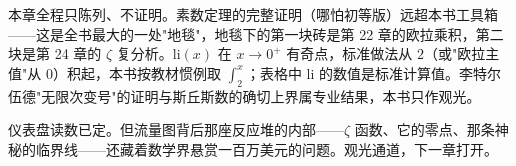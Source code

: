 \begin{chengshi}
本章全程只陈列、不证明。素数定理的完整证明（哪怕初等版）远超本书工具箱——这是全书最大的一处"地毯"，地毯下的第一块砖是第 22 章的欧拉乘积，第二块是第 24 章的 $\zeta$ 复分析。$\mathrm{li}(x)$ 在 $x\to0^+$ 有奇点，标准做法从 $2$（或"欧拉主值"从 $0$）积起，本书按教材惯例取 $\int_2^x$；表格中 $\mathrm{li}$ 的数值是标准计算值。李特尔伍德"无限次变号"的证明与斯丘斯数的确切上界属专业结果，本书只作观光。
\end{chengshi}

仪表盘读数已定。但流量图背后那座反应堆的内部——$\zeta$ 函数、它的零点、那条神秘的临界线——还藏着数学界悬赏一百万美元的问题。观光通道，下一章打开。
